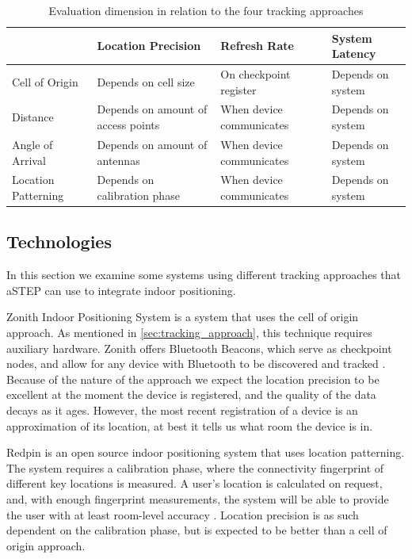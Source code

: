 \begin{table}[]
\centering
\begin{tabular}{|l|p{4cm}|p{4cm}|p{3.5cm}|}
\hline
                    & Location Precision                 & Refresh Rate             & System Latency    \\ \hline
Cell of Origin      & Depends on cell size				 & On checkpoint register   & Depends on system \\ \hline
Distance            & Depends on amount of access points & When device communicates & Depends on system \\ \hline
Angle of Arrival    & Depends on amount of antennas      & When device communicates & Depends on system \\ \hline
Location Patterning & Depends on calibration phase       & When device communicates & Depends on system \\ \hline
\end{tabular}
\caption{Evaluation dimension in relation to the four tracking approaches}
\label{tab:evaluating_approaches}
\end{table}

\subsection{Technologies}
In this section we examine some systems using different tracking approaches that aSTEP can use to integrate indoor positioning.

Zonith Indoor Positioning System is a system that uses the cell of origin approach. As mentioned in \cref{sec:tracking_approach}, this technique requires auxiliary hardware. Zonith offers Bluetooth Beacons, which serve as checkpoint nodes, and allow for any device with Bluetooth to be discovered and tracked \cite{zonith}. Because of the nature of the approach we expect the location precision to be excellent at the moment the device is registered, and the quality of the data decays as it ages. However, the most recent registration of a device is an approximation of its location, at best it tells us what room the device is in.

Redpin is an open source indoor positioning system that uses location patterning. The system requires a calibration phase, where the connectivity fingerprint of different key locations is measured. A user's location is calculated on request, and, with enough fingerprint measurements, the system will be able to provide the user with at least room-level accuracy \cite{redpin}. Location precision is as such dependent on the calibration phase, but is expected to be better than a cell of origin approach. 

